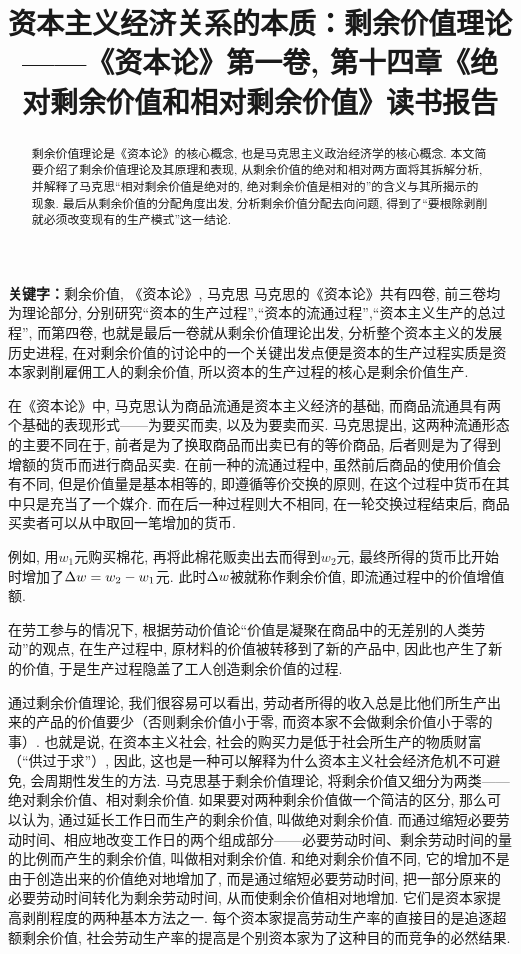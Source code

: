 \documentclass[UTF8,9pt]{ctexart}
\title{%
资本主义经济关系的本质：剩余价值理论 \\
  \large ——《资本论》第一卷, 第十四章《绝对剩余价值和相对剩余价值》\cite{title}读书报告}
\begin{document}
 
\maketitle
\begin{abstract}
    剩余价值理论是《资本论》的核心概念, 也是马克思主义政治经济学的核心概念. 本文简要介绍了剩余价值理论及其原理和表现, 从剩余价值的绝对和相对两方面将其拆解分析, 并解释了马克思``相对剩余价值是绝对的, 绝对剩余价值是相对的''的含义与其所揭示的现象. 最后从剩余价值的分配角度出发, 分析剩余价值分配去向问题, 得到了``要根除剥削就必须改变现有的生产模式''这一结论. 
\end{abstract}
\textbf{关键字：}剩余价值, 《资本论》, 马克思
\newpage%
\tableofcontents%
\newpage%
马克思的《资本论》共有四卷, 前三卷均为理论部分, 分别研究``资本的生产过程'',``资本的流通过程'',``资本主义生产的总过程'', 而第四卷, 也就是最后一卷就从剩余价值理论出发, 分析整个资本主义的发展历史进程, 在对剩余价值的讨论中的一个关键出发点便是资本的生产过程实质是资本家剥削雇佣工人的剩余价值, 所以资本的生产过程的核心是剩余价值生产. 

在《资本论》中, 马克思认为商品流通是资本主义经济的基础, 而商品流通具有两个基础的表现形式——为要买而卖, 以及为要卖而买. 马克思提出, 这两种流通形态的主要不同在于, 前者是为了换取商品而出卖已有的等价商品, 后者则是为了得到增额的货币而进行商品买卖\cite{1}. 在前一种的流通过程中, 虽然前后商品的使用价值会有不同, 但是价值量是基本相等的, 即遵循等价交换的原则, 在这个过程中货币在其中只是充当了一个媒介. 而在后一种过程则大不相同, 在一轮交换过程结束后, 商品买卖者可以从中取回一笔增加的货币. 

例如, 用$w_1$元购买棉花, 再将此棉花贩卖出去而得到$w_2$元, 最终所得的货币比开始时增加了$\Delta w=w_2-w_1$元. 此时$\Delta w$被就称作剩余价值, 即流通过程中的价值增值额. 

在劳工参与的情况下, 根据劳动价值论``价值是凝聚在商品中的无差别的人类劳动''的观点, 在生产过程中, 原材料的价值被转移到了新的产品中, 因此也产生了新的价值, 于是生产过程隐盖了工人创造剩余价值的过程. 

通过剩余价值理论, 我们很容易可以看出, 劳动者所得的收入总是比他们所生产出来的产品的价值要少（否则剩余价值小于零, 而资本家不会做剩余价值小于零的事）. 也就是说, 在资本主义社会, 社会的购买力是低于社会所生产的物质财富（``供过于求''）, 因此, 这也是一种可以解释为什么资本主义社会经济危机不可避免, 会周期性发生的方法. 
马克思基于剩余价值理论, 将剩余价值又细分为两类——绝对剩余价值、相对剩余价值. 如果要对两种剩余价值做一个简洁的区分, 那么可以认为, 通过延长工作日而生产的剩余价值, 叫做绝对剩余价值. 而通过缩短必要劳动时间、相应地改变工作日的两个组成部分——必要劳动时间、剩余劳动时间的量的比例而产生的剩余价值, 叫做相对剩余价值. 和绝对剩余价值不同, 它的增加不是由于创造出来的价值绝对地增加了, 而是通过缩短必要劳动时间, 把一部分原来的必要劳动时间转化为剩余劳动时间, 从而使剩余价值相对地增加. 它们是资本家提高剥削程度的两种基本方法之一. 每个资本家提高劳动生产率的直接目的是追逐超额剩余价值, 社会劳动生产率的提高是个别资本家为了这种目的而竞争的必然结果. 
\end{document}
